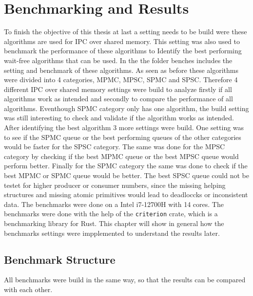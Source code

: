 \chapter{Benchmarking and Results}\label{ch:results}
To finish the objective of this thesis at last a setting needs to be build were these algorithms are used for \ac{IPC} over shared memory. This setting was also used to benchmark the performance of these algorithms to Identify the best performing wait-free algorithms that can be used. In the \cite{githubMA} the folder benches includes the setting and benchmark of these algorithms. As seen as before these algorithms were divided into 4 categories, \ac{MPMC}, \ac{MPSC}, \ac{SPMC} and \ac{SPSC}. Therefore 4 different \ac{IPC} over shared memory settings were build to analyze firstly if all algorithms work as intended and secondly to compare the performance of all algorithms. Eventhough \ac{SPMC} category only has one algorithm, the build setting was still interesting to check and validate if the algorithm works as intended. After identifying the best algorithm 3 more settings were build. One setting was to see if the \ac{SPMC} queue or the best performing queues of the other categories would be faster for the \ac{SPSC} category. The same was done for the \ac{MPSC} category by checking if the best \ac{MPMC} queue or the best \ac{MPSC} queue would perform better. Finally for the \ac{SPMC} category the same was done to check if the best \ac{MPMC} or  \ac{SPMC} queue would be better. The best \ac{SPSC} queue could not be testet for higher producer or consumer numbers, since the missing helping structures and missing atomic primitives would lead to deadloccks or inconsistent data. The benchmarks were done on a Intel i7-12700H with 14 cores. The benchmarks were done with the help of the \texttt{criterion} crate, which is a benchmarking library for Rust. This chapter will show in general how the benchmarks settings were impplemented to understand the results later.

\section{Benchmark Structure}
All benchmarks were build in the same way, so that the results can be compared with each other. 